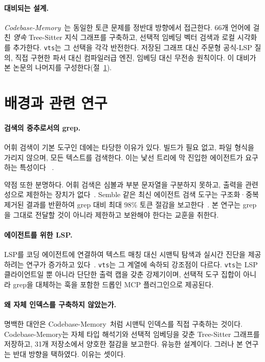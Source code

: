 \documentclass[11pt]{article}
\begin{document}
\paragraph{대비되는 설계.}
\emph{Codebase-Memory}~\cite{cbm}는 동일한 토큰 문제를 정반대 방향에서 접근한다. 66개
언어에 걸친 \emph{영속} Tree-Sitter 지식 그래프를 구축하고, 선택적 임베딩 벡터 검색과 로컬
시각화를 추가한다. \texttt{vts}는 그 선택을 각각 반전한다. 저장된 그래프 대신 주문형 공식-LSP
질의, 직접 구현한 파서 대신 컴파일러급 엔진, 임베딩 대신 무전송 원칙이다. 이 대비가 본 논문의
나머지를 구성한다(절~\ref{sec:related}).

\section{배경과 관련 연구}
\label{sec:related}

\paragraph{검색의 중추로서의 grep.}
어휘 검색이 기본 도구인 데에는 타당한 이유가 있다. 빌드가 필요 없고, 파일 형식을 가리지
않으며, 모든 텍스트를 검색한다. 이는 낯선 트리에 막 진입한 에이전트가 요구하는 특성이다
~\cite{yage-grep}.

약점 또한 분명하다. 어휘 검색은 심볼과 부분 문자열을 구분하지 못하고, 출력을 관련성으로
제한하는 장치가 없다~\cite{lsp-medium}. Semble 같은 최신 에이전트 검색 도구는 구조화·중복
제거된 결과를 반환하여 grep 대비 최대 $98\%$ 토큰 절감을 보고한다~\cite{semble-hn}. 본
연구는 grep을 그대로 전달할 것이 아니라 제한하고 보완해야 한다는 교훈을 취한다.

\paragraph{에이전트를 위한 LSP.}
LSP를 코딩 에이전트에 연결하여 텍스트 매칭 대신 시맨틱 탐색과 실시간 진단을 제공하려는 연구가
증가하고 있다~\cite{lsp-medium,anthropic-lsp,hyperagent}. \texttt{vts}는 그 계열에 속하되
강조점이 다르다. \texttt{vts}는 LSP 클라이언트일 뿐 아니라 단단한 출력 캡을 갖춘 강제기이며,
선택적 도구 집합이 아니라 grep을 대체하는 훅을 포함한 드롭인 MCP 플러그인으로 제공된다.

\paragraph{왜 자체 인덱스를 구축하지 않았는가.}
명백한 대안은 Codebase-Memory~\cite{cbm}처럼 시맨틱 인덱스를 직접 구축하는 것이다.
Codebase-Memory는 자체 타입 해석기와 선택적 임베딩을 갖춘 Tree-Sitter 그래프를 저장하고,
31개 저장소에서 양호한 절감을 보고한다. 유능한 설계이다. 그러나 본 연구는 반대 방향을 택하였다.
이유는 셋이다.
\end{document}
